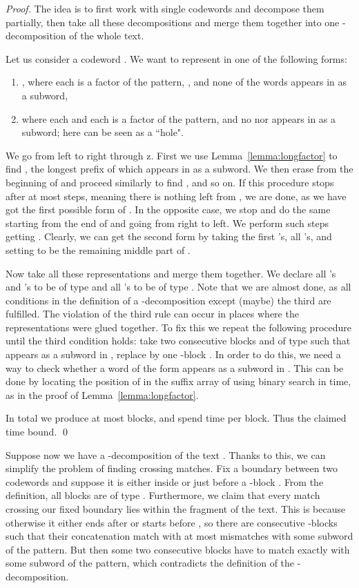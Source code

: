 \documentclass[runningheads]{llncs}
\begin{document}
\begin{proof}
The idea is to first work with single codewords and decompose them partially, then take all these decompositions and merge them together into one -decomposition of the whole text.

Let us consider a codeword . We want to represent  in one of the following forms:
\begin{enumerate}
\item , where each  is a factor of the pattern, , and none of the words  appears in  as a subword,
\item  where each  and each  is a factor of the pattern, and no  nor  appears in  as a subword; here  can be seen as a ``hole".
\end{enumerate}
We go from left to right through z. First we use Lemma~\ref{lemma:longfactor} to find , the longest prefix of  which appears in  as a subword. We then erase  from the beginning of  and proceed similarly to find , and so on. If this procedure stops after at most  steps, meaning there is nothing left from , we are done, as we have got the first possible form of . In the opposite case, we stop and do the same starting from the end of  and going from right to left. We perform  such steps getting . Clearly, we can get the second form by taking the first  's, all 's, and setting  to be the remaining middle part of .

Now take all these representations and merge them together. We declare all 's and 's to be of type  and all 's to be of type . Note that we are almost done, as all conditions in the definition of a -decomposition except (maybe) the third are fulfilled. The violation of the third rule can occur in places where the representations were glued together. To fix this we repeat the following procedure until the third condition holds: take two consecutive blocks  and  of type  such that  appears as a subword in , replace  by one -block . In order to do this, we need a way to check whether a word of the form  appears as a subword in . This can be done by locating the position of  in the suffix array of  using binary search in  time, as in the proof of Lemma~\ref{lemma:longfactor}.

In total we produce at most  blocks, and spend  time per block. Thus the claimed time bound.
\qed
\end{proof}

Suppose now we have a -decomposition of the text . Thanks to this, we can simplify the problem of finding crossing matches. Fix a boundary between two codewords and suppose it is either inside or just before a -block . From the definition, all blocks  are of type .  Furthermore, we claim that every match crossing our fixed boundary lies within the fragment  of the text. This is because otherwise it either ends after  or starts before , so there are  consecutive -blocks such that their concatenation match with at most  mismatches with some subword of the pattern. But then some two consecutive blocks have to match exactly with some subword of the pattern, which contradicts the definition of the -decomposition.
\end{document}
